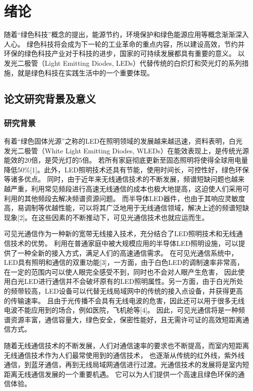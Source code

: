 
\chapter{绪论}\label{chap:introduction}
随着“绿色科技”概念的提出，能源节约，环境保护和绿色能源应用等概念渐渐深入人心。
绿色科技将会成为下一轮的工业革命的重点内容，所以建设高效，节约并环保的绿色科技产业对于科技的进步，国家的可持续发展都具有重要的意义。
以发光二极管（Light Emitting Diodes, LEDs）代替传统的白炽灯和荧光灯的系列措施，就是绿色科技在实践生活中的一个重要体现。

\section{论文研究背景及意义}\label{sec:background}
\subsection{研究背景}
有着“绿色固体光源”之称的LED在照明领域的发展越来越迅速，资料表明，白光发光二极管（White Light Emitting Diodes, WLEDs）在能效表现上，是传统光源能效的20倍，是荧光灯的5倍。
若所有家庭彻底更新至固态照明将使得全球用电量降低50\%[1]。此外，LED照明技术还具有节能，使用时间长，可控性好，绿色环保等诸多优点。
同时，由于近年来无线通信技术的不断发展，频谱短缺问题也越来越严重，利用常见频段进行高速无线通信的成本也极大地提高，这迫使人们采用可利用的其他频段去解决频谱资源问题。
而半导体LED器件，也由于其响应灵敏度高，易调制等优越性能，可以将其广泛地用于无线通信领域，解决上述的频谱短缺现象[2]。在这些因素的不断推动下，可见光通信技术也就应运而生。

可见光通信作为一种新的宽带无线接入技术，充分结合了LED照明技术和无线通信技术的优势。
利用在普通家庭中被大规模应用的半导体LED照明设施，可以提供了一种全新的接入方式，满足人们的高速通信需求。
在可见光通信系统中，LED具有照明和通信的双重功能[3]，一方面，由于白色LED的调制速率非常高，在一定的范围内可以使人眼完全感受不到，同时也不会对人眼产生危害，
因此使用白光LED进行通信并不会破坏原有的LED照明属性。另一方面，由于白光所处的频带较高，LED设备可以代替无线局域网中的传统的接入点设备，并获得更高的传输速率。
且由于光传播不会具有无线电波的危害，因此还可以用于很多无线电波不能应用到的场合，例如医院，飞机舱等[4]。
因此，可见光通信将是一种频谱资源丰富，通信容量大，绿色安全，保密性能好，且无需许可证的高效短距离通信方式。

随着无线通信技术的不断发展，人们对通信速率的要求也不断提高，而室内短距离无线通信技术作为人们最常使用到的通信技术，
也逐渐从传统的红外线，紫外线通信，到蓝牙通信，再到无线局域网通信进行过渡。光通信技术的发展将是室内短距离无线通信发展的一个重要机遇。
它可以为人们提供一个高速且绿色环保的通信体验。

